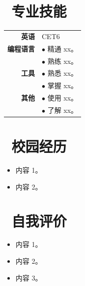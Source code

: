 \documentclass[]{resume}
\begin{document}
\section{\faCogs \, 专业技能}

\begin{tabular}{@{}rl}
    \textbf{英语}    & CET6 \\
    \textbf{编程语言} & $\bullet$ 精通 xx。 \\
                    & $\bullet$ 熟练 xx。 \\
    \textbf{工具}    & $\bullet$ 熟悉 xx。 \\
                    & $\bullet$ 掌握 xx。 \\
    \textbf{其他}    & $\bullet$  使用 xx。\\
                    & $\bullet$ 了解 xx。 \\
\end{tabular}

\section{\faBuilding \, 校园经历}


\begin{itemize}
    \item 内容 1。
    \item 内容 2。
\end{itemize}

\section{\faUser \, 自我评价}

\begin{itemize}
    \item 内容 1。
    \item 内容 2。
    \item 内容 3。
\end{itemize}
\end{document}
